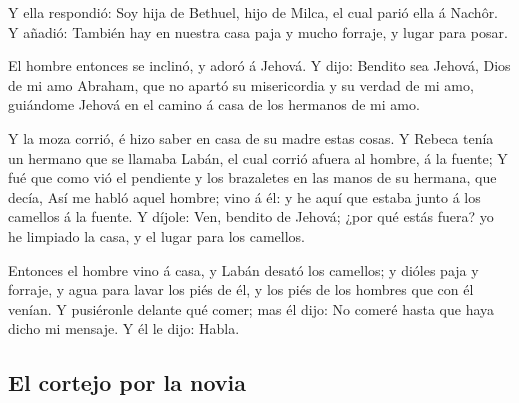  Y ella respondió: Soy hija de Bethuel, hijo de Milca, el
cual parió ella á Nachôr.  Y añadió: También hay en nuestra
casa paja y mucho forraje, y lugar para posar.

 El hombre entonces se inclinó, y adoró á Jehová.
 Y dijo: Bendito sea Jehová, Dios de mi amo Abraham, que no
apartó su misericordia y su verdad de mi amo, guiándome Jehová en el
camino á casa de los hermanos de mi amo.

 Y la moza corrió, é hizo saber en casa de su madre estas
cosas.  Y Rebeca tenía un hermano que se llamaba Labán, el
cual corrió afuera al hombre, á la fuente;  Y fué que como
vió el pendiente y los brazaletes en las manos de su hermana, que decía,
Así me habló aquel hombre; vino á él: y he aquí que estaba junto á los
camellos á la fuente.  Y díjole: Ven, bendito de Jehová;
¿por qué estás fuera? yo he limpiado la casa, y el lugar para los
camellos.

 Entonces el hombre vino á casa, y Labán desató los
camellos; y dióles paja y forraje, y agua para lavar los piés de él, y
los piés de los hombres que con él venían.  Y pusiéronle
delante qué comer; mas él dijo: No comeré hasta que haya dicho mi
mensaje. Y él le dijo: Habla.

\hypertarget{el-cortejo-por-la-novia}{%
\subsection{El cortejo por la novia}\label{el-cortejo-por-la-novia}}

